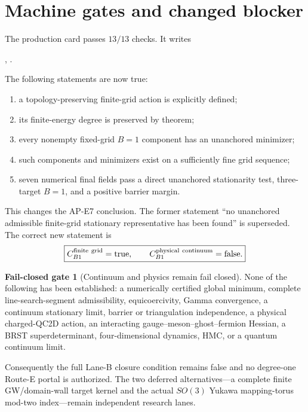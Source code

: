\documentclass[11pt]{article}
\numberwithin{equation}{section}
\theoremstyle{definition}
\newtheorem{gate}[theorem]{Fail-closed gate}
\theoremstyle{remark}
\begin{document}
\section{Machine gates and changed blocker}

The production card passes \(13/13\) checks.  It writes
\begin{center}
,\qquad
{}.
\end{center}
The following statements are now true:
\begin{enumerate}
\item a topology-preserving finite-grid action is explicitly defined;
\item its finite-energy degree is preserved by theorem;
\item every nonempty fixed-grid \(B=1\) component has an unanchored minimizer;
\item such components and minimizers exist on a sufficiently fine grid
sequence;
\item seven numerical final fields pass a direct unanchored stationarity test,
three-target \(B=1\), and a positive barrier margin.
\end{enumerate}

This changes the AP-E7 conclusion.  The former statement
``no unanchored admissible finite-grid stationary representative has been
found'' is superseded.  The correct new statement is
\begin{equation}
 \boxed{C_{B1}^{\rm finite\ grid}=\mathrm{true},\qquad
 C_{B1}^{\rm physical\ continuum}=\mathrm{false}.}
 \label{eq:changed-blocker}
\end{equation}

\begin{gate}[Continuum and physics remain fail closed]
None of the following has been established: a numerically certified global
minimum, complete line-search-segment admissibility, equicoercivity, Gamma
convergence, a continuum stationary limit, barrier or triangulation
independence, a physical charged-QC2D action, an interacting
gauge--meson--ghost--fermion Hessian, a BRST superdeterminant, four-dimensional
dynamics, HMC, or a quantum continuum limit.
\end{gate}

Consequently the full Lane-B closure condition remains false and no
degree-one Route-E portal is authorized.  The two deferred alternatives---a
complete finite GW/domain-wall target kernel and the actual \(SO(3)\) Yukawa
mapping-torus mod-two index---remain independent research lanes.
\end{document}
